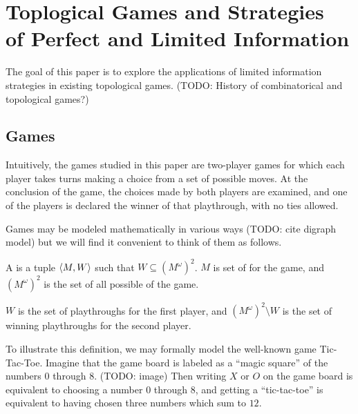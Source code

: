 
\chapter{Toplogical Games and Strategies\\ of Perfect and Limited Information}

The goal of this paper is to explore the applications of limited information
strategies in existing topological games. (TODO: History of combinatorical
and topological games?)

\section{Games}

Intuitively, the games studied in this paper are two-player games for which
each player takes turns making a choice from a set of possible moves. At
the conclusion of the game, the choices made by both players are examined,
and one of the players is declared the winner of that playthrough, with
no ties allowed.

Games may be modeled mathematically in various ways (TODO: cite digraph model)
but we will find it convenient to think of them as follows.

\begin{defn}
  A  is a tuple $\langle M,W\rangle$ such that 
  $W\subseteq (M^{\omega})^2$. $M$ is set of  for
  the game, and $(M^{\omega})^2$ is the set of all possible 
   of the game.

  $W$ is the set of  playthroughs for the 
  first player, and $(M^{\omega})^2\setminus W$ is the set of winning
  playthroughs for the second player.
\end{defn}

To illustrate this definition, we may formally model the well-known game 
Tic-Tac-Toe. Imagine that the game board is labeled as a ``magic square''
of the numbers $0$ through $8$. (TODO: image) Then writing $X$ or $O$ on
the game board is equivalent to choosing a number $0$ through $8$, and 
getting a ``tic-tac-toe'' is equivalent to having chosen three numbers which 
sum to $12$.

